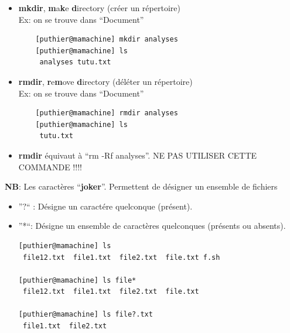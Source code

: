 \documentclass[10pt, xcolor=dvipsnames]{beamer}
\begin{document}
\begin{frame}[fragile]
        \begin{itemize}

            \item \textbf{mkdir}, \textbf{m}a\textbf{k}e \textbf{d}irectory (créer un répertoire)\\
            Ex: on se trouve dans ``Document''\\

         \begin{verbatim}
    [puthier@mamachine] mkdir analyses
    [puthier@mamachine] ls
     analyses tutu.txt
          \end{verbatim}

            \item \textbf{rmdir}, \textbf{r}e\textbf{m}ove \textbf{d}irectory (déléter un répertoire)\\
            Ex: on se trouve dans ``Document''\\
            \vspace{0.8mm}
          \begin{verbatim}
    [puthier@mamachine] rmdir analyses
    [puthier@mamachine] ls
     tutu.txt
          \end{verbatim}

            \item \textbf{rmdir} équivaut à ``rm -Rf analyses''. NE PAS UTILISER CETTE COMMANDE !!!!
        \end{itemize}

\end{frame}



\begin{frame}[fragile]

\textbf{NB}: Les caractères ``\textbf{joker}''. Permettent de désigner un ensemble de fichiers 
      
      \begin{itemize}
              \item ''$?$`` : Désigne un caractére quelconque (présent).
              \item ''*``: Désigne un ensemble de caractères quelconques (présents ou absents). 
          \begin{verbatim}
[puthier@mamachine] ls 
 file12.txt  file1.txt  file2.txt  file.txt f.sh

[puthier@mamachine] ls file*
 file12.txt  file1.txt  file2.txt  file.txt

[puthier@mamachine] ls file?.txt
 file1.txt  file2.txt

          \end{verbatim}
        \end{itemize}

\end{frame}
\end{document}
